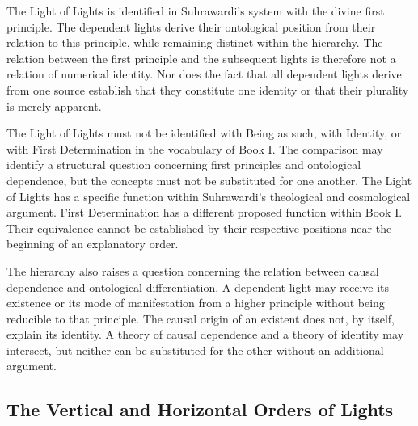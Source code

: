 \label{para:VS.B01.P01.C08.S14.SS08.P002}

The Light of Lights is identified in Suhrawardi's
system with the divine first principle. The
dependent lights derive their ontological
position from their relation to this principle,
while remaining distinct within the hierarchy.
The relation between the first principle and
the subsequent lights is therefore not a relation
of numerical identity. Nor does the fact that
all dependent lights derive from one source
establish that they constitute one identity or
that their plurality is merely apparent.

\label{para:VS.B01.P01.C08.S14.SS08.P003}

The Light of Lights must not be identified with
Being as such, with Identity, or with First
Determination in the vocabulary of Book I.
The comparison may identify a structural
question concerning first principles and
ontological dependence, but the concepts
must not be substituted for one another.
The Light of Lights has a specific function
within Suhrawardi's theological and cosmological
argument. First Determination has a different
proposed function within Book I. Their
equivalence cannot be established by their
respective positions near the beginning of
an explanatory order.

\label{para:VS.B01.P01.C08.S14.SS08.P004}

The hierarchy also raises a question concerning
the relation between causal dependence and
ontological differentiation. A dependent light
may receive its existence or its mode of
manifestation from a higher principle without
being reducible to that principle. The causal
origin of an existent does not, by itself,
explain its identity. A theory of causal
dependence and a theory of identity may
intersect, but neither can be substituted
for the other without an additional argument.


\subsection{The Vertical and Horizontal Orders of Lights}
\label{sec:ch08-s14-ss09}

